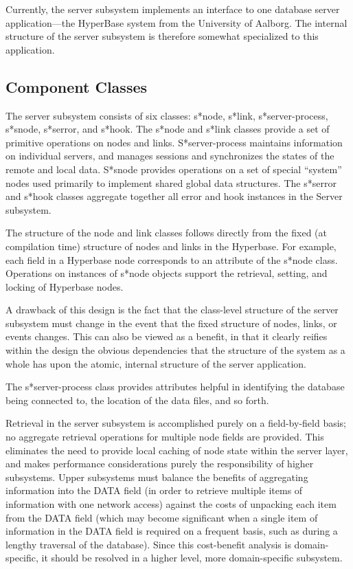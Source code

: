 Currently, the server subsystem implements an interface to one database
server application---the HyperBase system from the University of Aalborg.
The internal structure of the server subsystem is therefore somewhat
specialized to this application. 

\subsection{Component Classes}

The server subsystem consists of six classes: {\sf s*node}, {\sf s*link}, {\sf
s*server-process}, {\sf s*snode}, {\sf s*serror}, and {\sf s*hook}. The {\sf
s*node} and {\sf s*link} classes provide a set of primitive operations on
nodes and links. {\sf S*server-process } maintains information on individual
servers, and manages sessions and synchronizes the states of the remote and
local data. {\sf S*snode} provides operations on a set of special ``system''
nodes used primarily to implement  shared global data structures. The {\sf
s*serror }  and  {\sf s*hook} classes aggregate together all error and hook
instances in the Server subsystem.

The structure of the node and link classes follows directly from the fixed (at
compilation time) structure of nodes and links in the Hyperbase. For example,
each field in a Hyperbase node corresponds to an attribute of the
{\sf s*node} class.  Operations on  instances of {\sf s*node} objects
support the retrieval, setting, and locking of Hyperbase nodes. 

A drawback of this design is the fact that the class-level structure
of the server subsystem must change in the event that the fixed
structure of nodes, links, or events changes.  This can also be viewed
as a benefit, in that it clearly reifies within the design the obvious
dependencies that the structure of the system as a whole has upon the
atomic, internal structure of the server application.  

The {\sf s*server-process} class provides attributes helpful in identifying the
database being connected to, the location of the data files, and so forth.

Retrieval in the server subsystem is accomplished purely on a
field-by-field basis; no aggregate retrieval operations for multiple
node fields are provided.  This eliminates the need to provide local
caching of node state within the server layer, and makes performance
considerations purely the responsibility of higher subsystems.  Upper
subsystems must balance the benefits of aggregating information into
the DATA field (in order to retrieve multiple items of information
with one network access) against the costs of unpacking each item from
the DATA field (which may become significant when a single item of
information in the DATA field is required on a frequent basis, such as
during a lengthy traversal of the database).  Since this cost-benefit
analysis is domain-specific, it should be resolved in a higher level,
more domain-specific subsystem.

